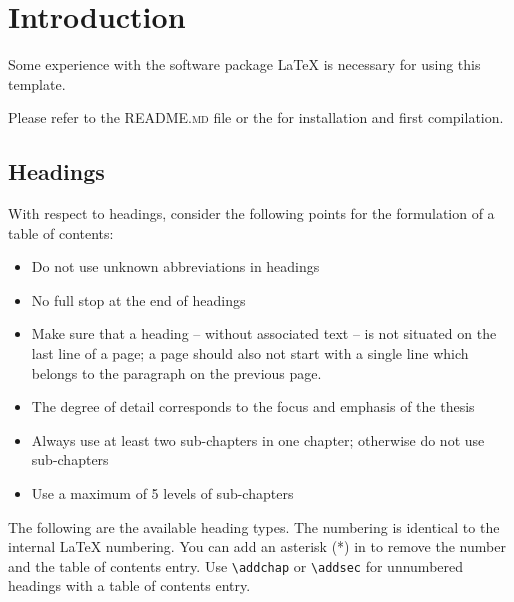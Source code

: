 \chapter{Introduction} %

Some experience with the software package {\LaTeX} is necessary for using this template.

Please refer to the \textsc{README.md} file or the  for installation and first compilation.

\section{Headings}
With respect to headings, consider the following points for the formulation of a table of contents:
\begin{itemize}
    \item Do not use unknown abbreviations in headings
    \item No full stop at the end of headings
    \item Make sure that a heading -- without associated text -- is not situated on the last line of a page; a page should also not start with a single line which belongs to the paragraph on the previous page.
    \item The degree of detail corresponds to the focus and emphasis of the thesis
    \item Always use at least two sub-chapters in one chapter; otherwise do not use sub-chapters
    \item Use a maximum of 5 levels of sub-chapters
\end{itemize}

The following are the available heading types. The numbering is identical to the internal \LaTeX{} numbering. You can add an asterisk (*) in to remove the number and the table of contents entry. Use \verb*|\addchap| or \verb*|\addsec| for unnumbered headings with a table of contents entry.

